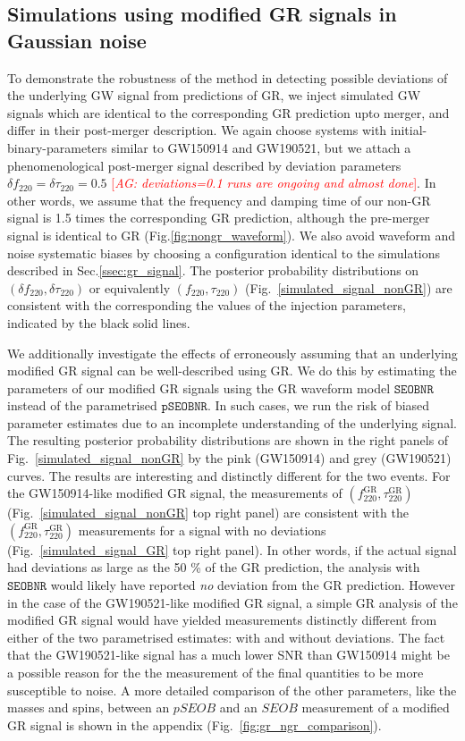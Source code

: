 \documentclass[twocolumn,prd,superscriptaddress,amsfonts,amssymb,amsmath,preprintnumbers]{revtex4-1}
\newcommand{\abhi}[1]{\textcolor{red}{[\textit{AG: #1}]}}
\newcommand{\df}[1]{\delta f_{\text{#1}}}
\newcommand{\dtau}[1]{\delta \tau_{\text{#1}}}
\newcommand{\fngr}[1]{f_{\text{#1}}}
\newcommand{\taungr}[1]{\tau_{\text{#1}}}
\newcommand{\fgr}[1]{f ^{\text{GR}}_{\text{#1}}}
\newcommand{\taugr}[1]{\tau ^{\text{GR}}_{\text{#1}}}
\newcommand{\pSEOB}{\texttt{pSEOBNR}}
\newcommand{\SEOB}{\texttt{SEOBNR}}
\begin{document}
\subsection{Simulations using modified GR signals in Gaussian noise}

To demonstrate the robustness of the method in detecting possible deviations of the underlying GW signal from predictions of GR, we inject simulated GW signals which are identical to the corresponding GR prediction upto merger, and differ in their post-merger description. We again choose systems with initial-binary-parameters similar to GW150914 and GW190521, but we attach a phenomenological post-merger signal described by deviation parameters $\df{220} = \dtau{220} = 0.5$ \abhi{deviations=0.1 runs are ongoing and almost done}. In other words, we assume that the frequency and damping time of our non-GR signal is 1.5 times the corresponding GR prediction, although the pre-merger signal is identical to GR (Fig.\ref{fig:nongr_waveform}). We also avoid waveform and noise systematic biases by choosing a configuration identical to the simulations described in Sec.\ref{ssec:gr_signal}. The posterior probability distributions on $(\df{220}, \dtau{220})$ or equivalently $(\fngr{220}, \taungr{220})$ (Fig.~\ref{simulated_signal_nonGR}) are consistent with the corresponding the values of the injection parameters, indicated by the black solid lines. 

We additionally investigate the effects of erroneously assuming that an underlying modified GR signal can be well-described using GR. We do this by estimating the parameters of our modified GR signals using the GR waveform model $\SEOB$ instead of the parametrised $\pSEOB$. In such cases, we run the risk of biased parameter estimates due to an incomplete understanding of the underlying signal. The resulting posterior probability distributions are shown in the right panels of Fig.~\ref{simulated_signal_nonGR} by the pink (GW150914) and grey (GW190521) curves. The results are interesting and distinctly different for the two events. For the GW150914-like modified GR signal, the measurements of $(\fgr{220}, \taugr{220})$ (Fig.~\ref{simulated_signal_nonGR} top right panel) are consistent with the $(\fgr{220}, \taugr{220})$ measurements for a signal with no deviations (Fig.~\ref{simulated_signal_GR} top right panel). In other words, if the actual signal had deviations as large as the 50 \% of the GR prediction, the analysis with $\SEOB$ would likely have reported \emph{no} deviation from the GR prediction. However in the case of the GW190521-like modified GR signal, a simple GR analysis of the modified GR signal would have yielded measurements distinctly different from either of the two parametrised estimates: with and without deviations. The fact that the GW190521-like signal has a much lower SNR than GW150914 might be a possible reason for the the measurement of the final quantities to be more susceptible to noise. A more detailed comparison of the other parameters, like the masses and spins, between an $pSEOB$ and an $SEOB$ measurement of a modified GR signal is shown in the appendix (Fig.~\ref{fig:gr_ngr_comparison}).
\end{document}
